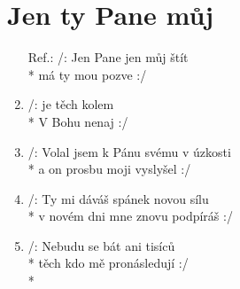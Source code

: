 \section{Jen ty Pane můj}
\begin{enumerate}
\item[Ref.:] /: Jen  Pane  jen  můj štít \\*
má  ty mou  pozve :/ 
\item /:  je těch  kolem  \\*
V Bohu   nenaj :/ 
\item /: Volal jsem k Pánu svému v úzkosti \\*
a on prosbu moji vyslyšel :/ 
\item /: Ty mi dáváš spánek novou sílu \\*
v novém dni mne znovu podpíráš :/ 
\item /: Nebudu se bát ani tisíců \\*
těch kdo mě pronásledují :/ \\*
\end{enumerate}
